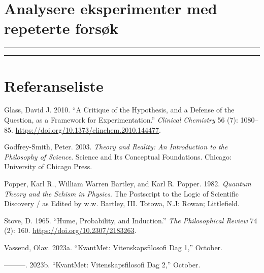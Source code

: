 \documentclass[
  letterpaper,
  DIV=11,
  numbers=noendperiod]{scrreprt}
\newlength{\cslhangindent}
\newlength{\cslentryspacingunit} %
\newenvironment{CSLReferences}[2] %
 {%
  \setlength{\parindent}{0pt}
  \ifodd #1
  \let\oldpar\par
  \def\par{\hangindent=\cslhangindent\oldpar}
  \fi
  \setlength{\parskip}{#2\cslentryspacingunit}
 }%
 {}
\begin{document}

\hypertarget{analysere-eksperimenter-med-repeterte-forsuxf8k}{%
\chapter{Analysere eksperimenter med repeterte
forsøk}\label{analysere-eksperimenter-med-repeterte-forsuxf8k}}

\begin{center}\rule{0.5\linewidth}{0.5pt}\end{center}

\begin{center}\rule{0.5\linewidth}{0.5pt}\end{center}


\hypertarget{referanseliste}{%
\chapter*{Referanseliste}\label{referanseliste}}


\hypertarget{refs}{}
\begin{CSLReferences}{1}{0}
\leavevmode{}%
Glass, David J. 2010. {``A Critique of the Hypothesis, and a Defense of
the Question, as a Framework for Experimentation.''} \emph{Clinical
Chemistry} 56 (7): 1080--85.
\url{https://doi.org/10.1373/clinchem.2010.144477}.

\leavevmode{}%
Godfrey-Smith, Peter. 2003. \emph{Theory and Reality: An Introduction to
the Philosophy of Science}. Science and Its Conceptual Foundations.
Chicago: University of Chicago Press.

\leavevmode{}%
Popper, Karl R., William Warren Bartley, and Karl R. Popper. 1982.
\emph{Quantum Theory and the Schism in Physics}. The Postscript to the
Logic of Scientific Discovery / as Edited by w.w. Bartley, III. Totowa,
N.J: Rowan; Littlefield.

\leavevmode{}%
Stove, D. 1965. {``Hume, Probability, and Induction.''} \emph{The
Philosophical Review} 74 (2): 160.
\url{https://doi.org/10.2307/2183263}.

\leavevmode{}%
Vassend, Olav. 2023a. {``KvantMet: Vitenskapsfilosofi Dag 1,''} October.

\leavevmode{}%
---------. 2023b. {``KvantMet: Vitenskapsfilosofi Dag 2,''} October.

\end{CSLReferences}
\end{document}
